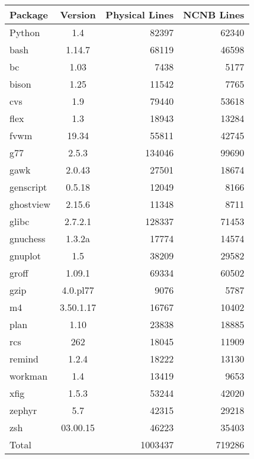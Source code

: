 \begin{tabular}{|l|c|r|r|}\hline
Package & Version  & Physical Lines & NCNB Lines\\\hline\hline
Python & 1.4 &82397 & 62340\\\hline
bash & 1.14.7 &68119 & 46598\\\hline
bc & 1.03 &7438 & 5177\\\hline
bison & 1.25 &11542 & 7765\\\hline
cvs & 1.9 &79440 & 53618\\\hline
flex & 1.3 &18943 & 13284\\\hline
fvwm & 19.34 &55811 & 42745\\\hline
g77 & 2.5.3 &134046 & 99690\\\hline
gawk & 2.0.43 &27501 & 18674\\\hline
genscript & 0.5.18 &12049 & 8166\\\hline
ghostview & 2.15.6 &11348 & 8711\\\hline
glibc & 2.7.2.1 &128337 & 71453\\\hline
gnuchess & 1.3.2a &17774 & 14574\\\hline
gnuplot & 1.5 &38209 & 29582\\\hline
groff & 1.09.1 &69334 & 60502\\\hline
gzip & 4.0.pl77 &9076 & 5787\\\hline
m4 & 3.50.1.17 &16767 & 10402\\\hline
plan & 1.10 &23838 & 18885\\\hline
rcs & 262 &18045 & 11909\\\hline
remind & 1.2.4 &18222 & 13130\\\hline
workman & 1.4 &13419 & 9653\\\hline
xfig & 1.5.3 &53244 & 42020\\\hline
zephyr & 5.7 &42315 & 29218\\\hline
zsh & 03.00.15 &46223 & 35403\\\hline\hline
\multicolumn{2}{|l|}{Total} & 1003437 & 719286\\\hline
\end{tabular}
